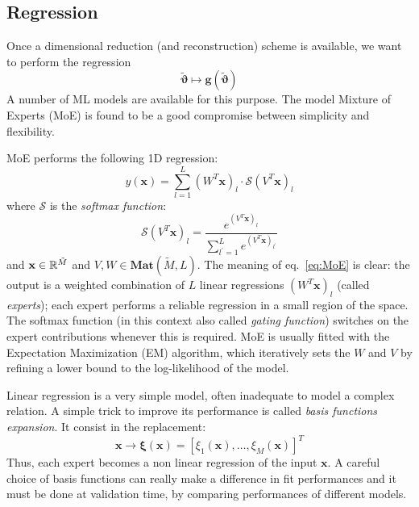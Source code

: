 \subsection{Regression}
Once a dimensional reduction (and reconstruction) scheme is available, we want to perform the regression
\begin{equation} \label{eq:regression_model}
	{\tilde{\boldsymbol{\vartheta}}} \longmapsto \boldsymbol{g}({\tilde{\boldsymbol{\vartheta}}})
\end{equation}
A number of ML models are available for this purpose. The model Mixture of Experts (MoE) \cite{Jacobs1991AdaptiveMoE} \cite[ch. 11]{murphy2012machine} is found to be a good compromise between simplicity and flexibility.
\par
MoE performs the following 1D regression:
\begin{equation} \label{eq:MoE}
	y(\mathbf{x}) = \sum_{l=1}^L (W^T \mathbf{x})_l \cdot \mathcal{S}(V^T\mathbf{x})_l
\end{equation}
where $\mathcal{S}$ is the \textit{softmax function}:
\begin{equation} \label{eq:softmax}
	\mathcal{S}(V^T{\mathbf{x}})_l = \frac{e^{(V^T{\mathbf{x}})_l}}{\sum_{l^\prime = 1}^L e^{(V^T{\mathbf{x}})_{l^\prime}}}
\end{equation}
and ${\mathbf{x}} \in \mathbb{R}^{\tilde{M}}$ and $V,W \in \mathbf{Mat}(\tilde{M},L)$.
The meaning of eq.~\eqref{eq:MoE} is clear: the output is a weighted combination of $L$ linear regressions $(W^T \mathbf{x})_l$ (called \textit{experts}); each expert performs a reliable regression in a small region of the space. The softmax function (in this context also called \textit{gating function}) switches on the expert contributions whenever this is required.
MoE is usually fitted with the Expectation Maximization (EM) algorithm, which iteratively sets the $W$ and $V$ by refining a lower bound to the log-likelihood of the model.
\par
Linear regression is a very simple model, often inadequate to model a complex relation. A simple trick to improve its performance is called \textit{basis functions expansion}. It consist in the replacement:
\begin{equation}
	{\mathbf{x}} \longrightarrow {\boldsymbol{\xi}}({\mathbf{x}}) = [\xi_1({\mathbf{x}}), \ldots, \xi_M({\mathbf{x}})]^T
\end{equation}
Thus, each expert becomes a non linear regression of the input ${\mathbf{x}}$.
A careful choice of basis functions can really make a difference in fit performances and it must be done at validation time, by comparing performances of different models.
